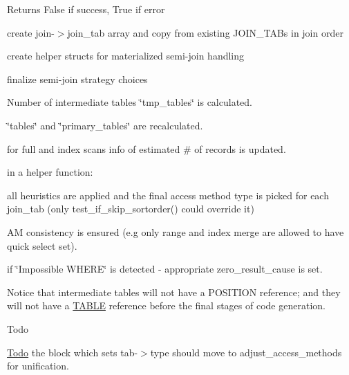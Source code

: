 \begin{DoxyReturn}{Returns}
False if success, True if error
\end{DoxyReturn}

\begin{DoxyItemize}
\item create join-\/$>$join\+\_\+tab array and copy from existing J\+O\+I\+N\+\_\+\+T\+A\+Bs in join order
\item create helper structs for materialized semi-\/join handling
\item finalize semi-\/join strategy choices
\item Number of intermediate tables \char`\"{}tmp\+\_\+tables\char`\"{} is calculated.
\item \char`\"{}tables\char`\"{} and \char`\"{}primary\+\_\+tables\char`\"{} are recalculated.
\item for full and index scans info of estimated \# of records is updated.
\item in a helper function\+:
\begin{DoxyItemize}
\item all heuristics are applied and the final access method type is picked for each join\+\_\+tab (only test\+\_\+if\+\_\+skip\+\_\+sortorder() could override it)
\item AM consistency is ensured (e.\+g only range and index merge are allowed to have quick select set).
\item if \char`\"{}\+Impossible W\+H\+E\+R\+E\char`\"{} is detected -\/ appropriate zero\+\_\+result\+\_\+cause is set.
\end{DoxyItemize}
\end{DoxyItemize}

Notice that intermediate tables will not have a P\+O\+S\+I\+T\+I\+ON reference; and they will not have a \mbox{\hyperlink{structTABLE}{T\+A\+B\+LE}} reference before the final stages of code generation.

\begin{DoxyRefDesc}{Todo}
\item[\mbox{\hyperlink{todo__todo000095}{Todo}}]the block which sets tab-\/$>$type should move to adjust\+\_\+access\+\_\+methods for unification. \end{DoxyRefDesc}
\mbox{\label{group__Query__Optimizer_ga67d1175177356bf1c9b05e9104d28c5b}} 
